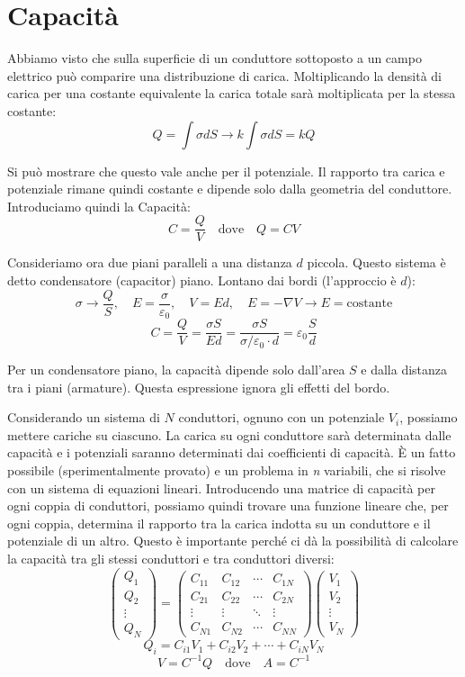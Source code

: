 \documentclass{article}
\begin{document}
\section*{Capacità}

Abbiamo visto che sulla superficie di un conduttore sottoposto a un campo elettrico può comparire una distribuzione di carica. Moltiplicando la densità di carica per una costante equivalente la carica totale sarà moltiplicata per la stessa costante:
\[
Q = \int \sigma dS \rightarrow k \int \sigma dS = kQ
\]

Si può mostrare che questo vale anche per il potenziale. Il rapporto tra carica e potenziale rimane quindi costante e dipende solo dalla geometria del conduttore. Introduciamo quindi la Capacità:
\[
C = \frac{Q}{V} \quad \text{dove} \quad Q = CV
\]

Consideriamo ora due piani paralleli a una distanza \( d \) piccola. Questo sistema è detto condensatore (capacitor) piano. Lontano dai bordi (l'approccio è \( d \)):
\[
\sigma \rightarrow \frac{Q}{S}, \quad E = \frac{\sigma}{\varepsilon_0}, \quad V = Ed, \quad E = -\nabla V \rightarrow E = \text{costante}
\]
\[
C = \frac{Q}{V} = \frac{\sigma S}{Ed} = \frac{\sigma S}{\sigma/\varepsilon_0 \cdot d} = \varepsilon_0 \frac{S}{d}
\]

Per un condensatore piano, la capacità dipende solo dall'area \( S \) e dalla distanza tra i piani (armature). Questa espressione ignora gli effetti del bordo.

Considerando un sistema di \( N \) conduttori, ognuno con un potenziale \( V_i \), possiamo mettere cariche su ciascuno. La carica su ogni conduttore sarà determinata dalle capacità e i potenziali saranno determinati dai coefficienti di capacità. È un fatto possibile (sperimentalmente provato) e un problema in \textit{n} variabili, che si risolve con un sistema di equazioni lineari. Introducendo una matrice di capacità per ogni coppia di conduttori, possiamo quindi trovare una funzione lineare che, per ogni coppia, determina il rapporto tra la carica indotta su un conduttore e il potenziale di un altro. Questo è importante perché ci dà la possibilità di calcolare la capacità tra gli stessi conduttori e tra conduttori diversi:
\[
\begin{pmatrix}
Q_1 \\
Q_2 \\
\vdots \\
Q_N
\end{pmatrix}
=
\begin{pmatrix}
C_{11} & C_{12} & \cdots & C_{1N} \\
C_{21} & C_{22} & \cdots & C_{2N} \\
\vdots & \vdots & \ddots & \vdots \\
C_{N1} & C_{N2} & \cdots & C_{NN} 
\end{pmatrix}
\begin{pmatrix}
V_1 \\
V_2 \\
\vdots \\
V_N
\end{pmatrix}
\]
\[
Q_i = C_{i1}V_1 + C_{i2}V_2 + \cdots + C_{iN}V_N
\]
\[
V = C^{-1}Q \quad \text{dove} \quad A = C^{-1}
\]
\end{document}
